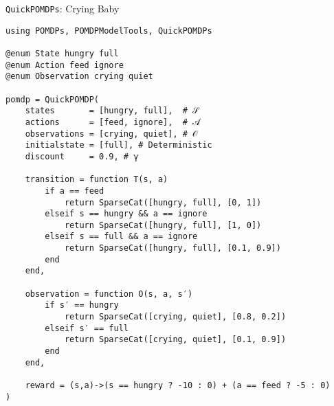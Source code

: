 
\begin{frame}[fragile]{\texttt{QuickPOMDPs}: Crying Baby}

\begin{lrbox}{\cryingbabycode}%
\begin{lstlisting}[language=JuliaLocal, style=julia]
using POMDPs, POMDPModelTools, QuickPOMDPs

@enum State hungry full
@enum Action feed ignore
@enum Observation crying quiet

pomdp = QuickPOMDP(
    states       = [hungry, full],  # 𝒮
    actions      = [feed, ignore],  # 𝒜
    observations = [crying, quiet], # 𝒪
    initialstate = [full], # Deterministic
    discount     = 0.9, # γ

    transition = function T(s, a)
        if a == feed
            return SparseCat([hungry, full], [0, 1])
        elseif s == hungry && a == ignore
            return SparseCat([hungry, full], [1, 0])
        elseif s == full && a == ignore
            return SparseCat([hungry, full], [0.1, 0.9])
        end
    end,

    observation = function O(s, a, s′)
        if s′ == hungry
            return SparseCat([crying, quiet], [0.8, 0.2])
        elseif s′ == full
            return SparseCat([crying, quiet], [0.1, 0.9])
        end
    end,

    reward = (s,a)->(s == hungry ? -10 : 0) + (a == feed ? -5 : 0)
)
\end{lstlisting}
\end{lrbox}%



\end{frame}
